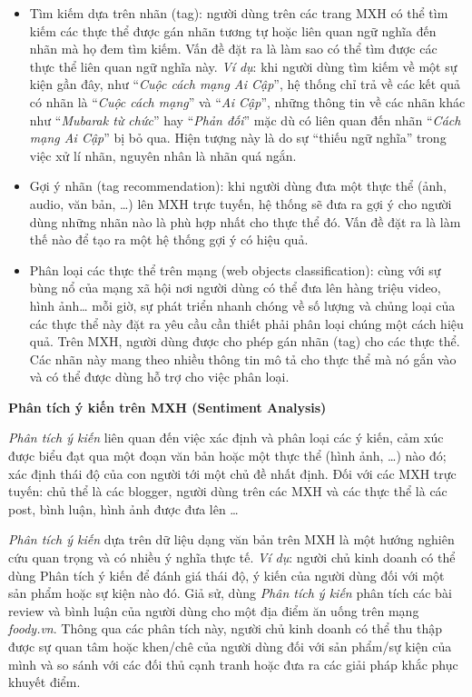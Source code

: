\documentclass[12pt]{extarticle}
\begin{document}
			\begin{itemize}
				\item Tìm kiếm dựa trên nhãn (tag): người dùng trên các trang MXH có thể tìm kiếm các thực thể được gán nhãn tương tự hoặc liên quan ngữ nghĩa đến nhãn mà họ đem tìm kiếm. Vấn đề đặt ra là làm sao có thể tìm được các thực thể liên quan ngữ nghĩa này. \textit{Ví dụ}: khi người dùng tìm kiếm về một sự kiện gần đây, như “\textit{Cuộc cách mạng Ai Cập}”, hệ thống chỉ trả về các kết quả có nhãn là “\textit{Cuộc cách mạng}” và “\textit{Ai Cập}”, những thông tin về các nhãn khác như “\textit{Mubarak từ chức}” hay “\textit{Phản đối}” mặc dù có liên quan đến nhãn “\textit{Cách mạng Ai Cập}” bị bỏ qua. Hiện tượng này là do sự “thiếu ngữ nghĩa” trong việc xử lí nhãn, nguyên nhân là nhãn quá ngắn.
				\item Gợi ý nhãn (tag recommendation): khi người dùng đưa một thực thể (ảnh, audio, văn bản, …) lên MXH trực tuyến, hệ thống sẽ đưa ra gợi ý cho người dùng những nhãn nào là phù hợp nhất cho thực thể đó. Vấn đề đặt ra là làm thế nào để tạo ra một hệ thống gợi ý có hiệu quả.   
				\item Phân loại các thực thể trên mạng (web objects classification): cùng với sự bùng nổ của mạng xã hội nơi người dùng có thể đưa lên hàng triệu video, hình ảnh… mỗi giờ, sự phát triển nhanh chóng về số lượng và chủng loại của các thực thể này đặt ra yêu cầu cần thiết phải phân loại chúng một cách hiệu quả. Trên MXH, người dùng được cho phép gán nhãn (tag) cho các thực thể. Các nhãn này mang theo nhiều thông tin mô tả cho thực thể mà nó gắn vào và có thể được dùng hỗ trợ cho việc phân loại.
			\end{itemize}
			\par \textbf{Phân tích ý kiến trên MXH (Sentiment Analysis)}
			\par \textit{Phân tích ý kiến} liên quan đến việc xác định và phân loại các ý kiến, cảm xúc được biểu đạt qua một đoạn văn bản hoặc một thực thể (hình ảnh, …) nào đó; xác định thái độ của con người tới một chủ đề nhất định. Đối với các MXH trực tuyến: chủ thể là các blogger, người dùng trên các MXH và các thực thể là các post, bình luận, hình ảnh được đưa lên …
			\par \textit{Phân tích ý kiến} dựa trên dữ liệu dạng văn bản trên MXH là một hướng nghiên cứu quan trọng và có nhiều ý nghĩa thực tế. \textit{Ví dụ}: người chủ kinh doanh có thể dùng Phân tích ý kiến để đánh giá thái độ, ý kiến của người dùng đối với một sản phẩm hoặc sự kiện nào đó. Giả sử, dùng \textit{Phân tích ý kiến} phân tích các bài review và bình luận của người dùng cho một địa điểm ăn uống trên mạng \textit{foody.vn}. Thông qua các phân tích này, người chủ kinh doanh có thể thu thập được sự quan tâm hoặc khen/chê của người dùng đối với sản phẩm/sự kiện của mình và so sánh với các đối thủ cạnh tranh hoặc đưa ra các giải pháp khắc phục khuyết điểm.
\end{document}

